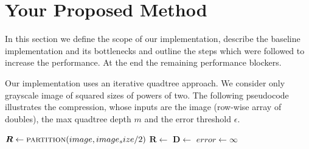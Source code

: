 \section{Your Proposed Method}\label{sec:yourmethod}






In this section we define the scope of our implementation, describe the baseline
implementation and its bottlenecks and outline the steps which were followed to
increase the performance. At the end the remaining performance blockers.

Our implementation uses an iterative quadtree approach. We consider only grayscale image of squared sizes of powers of two.
The following pseudocode illustrates the compression, whose inputs are the image (row-wise array of doubles), 
the max quadtree depth $m$ and the error threshold $\epsilon$.
\begin{algorithmic}
    \State $\boldsymbol{R} \gets \Call{partition}{image, image_size / 2}$  
     
        \State $\boldsymbol{R} \gets $ 
        \State $\boldsymbol{D} \gets $ 
            \State $error \gets \infty$

            \EndFor
        \EndFor
    \EndFor
\end{algorithmic}

